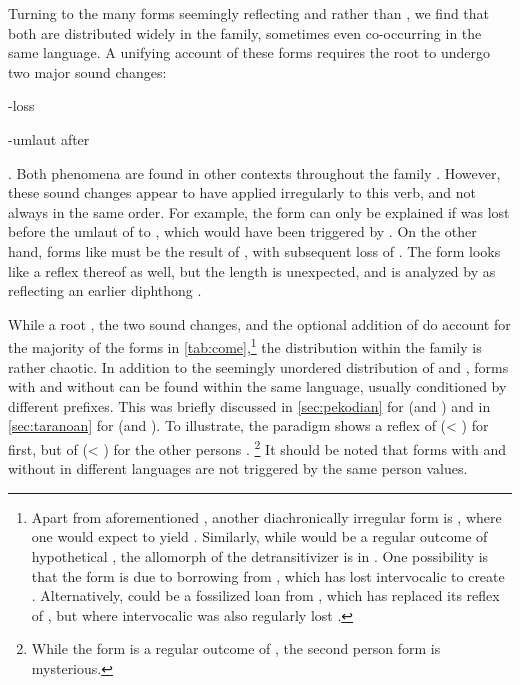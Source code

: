 Turning to the many forms seemingly reflecting  and  rather than , we find that both are distributed widely in the family, sometimes even co-occurring in the same language.
A unifying account of these forms requires the root  to undergo two major sound changes: \begin{inlinelist}
 \item {}-loss
 \item {}-umlaut after 
 \end{inlinelist}.
Both phenomena are found in other contexts throughout the family \parencite{meira2010origin}.
However, these sound changes appear to have applied irregularly to this verb, and not always in the same order.
For example, the \kalina form  can only be explained if  was lost before the umlaut of  to , which would have been triggered by .
On the other hand, forms like \maqui {} must be the result of , with subsequent loss of .
The \akuriyo form  looks like a reflex thereof as well, but the length is unexpected, and is analyzed by \textcite[]{meira1998proto} as reflecting an earlier diphthong .


While a root , the two sound changes, and the optional addition of  do account for the majority of the forms in \cref{tab:come},\footnote{
	Apart from aforementioned \akuriyo {}, another diachronically irregular form is \apalai {}, where one would expect  to yield  \parencite[506]{meira2010origin}.
	Similarly, while  would be a regular outcome of hypothetical , the  allomorph of the detransitivizer is  in \apalai.
	One possibility is that the form is due to borrowing from \trio, which has lost intervocalic  to create .
	Alternatively, \apalai {} could be a fossilized loan from \wayana, which has replaced its reflex of , but where intervocalic  was also regularly lost \parencite[63]{wayanatavares2005}.}
the distribution within the family is rather chaotic.
In addition to the seemingly unordered distribution of  and , forms with and without  can be found within the same language, usually conditioned by different prefixes.
This was briefly discussed in \cref{sec:pekodian} for \arara (and \PPek) and in \cref{sec:taranoan} for \trio (and \PTar).
To illustrate, the \trio \setone paradigm shows a reflex of  (< ) for first, but of  (< ) for the other persons .%
\footnote{While the  form is a regular outcome of , the second person form is mysterious.}
It should be noted that forms with and without  in different languages are not triggered by the same person values.


